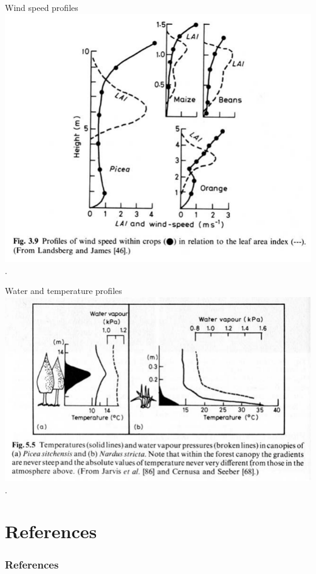 \documentclass[10pt]{beamer}
\begin{document}
\begin{frame}{Wind speed profiles}
    \centering\includegraphics[height=0.70\textheight]{figures/Grace3.9WindProfile}\\
    {\small \autocite[from][]{Grace1983}.}
\end{frame}

\begin{frame}{Water and temperature profiles}
    \centering\includegraphics[width=\textwidth]{figures/Grace5.5WaterTempProfileCanopies}\\
    {\small \autocite[from][]{Grace1983}.}
\end{frame}

\section*{References}

  \begin{frame}[t,allowframebreaks]
    \frametitle{References}
    \printbibliography
  \end{frame}
\end{document}
